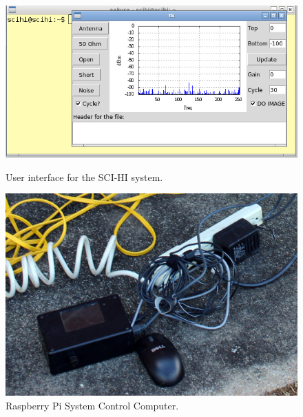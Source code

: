 \begin{figure}[htb]
\centering
\begin{minipage}[b]{0.48\textwidth}
\centering
\includegraphics[width=0.95\linewidth]{SCIHI_system/figures/SCIHI_UI_Screen.jpg}
\caption{User interface for the SCI-HI system. }
\label{Fig:GUI}
\end{minipage}%
\begin{minipage}[b]{0.02\textwidth}
\hspace{1cm}
\end{minipage}%
\begin{minipage}[b]{0.48\textwidth}
\centering
\includegraphics[width=0.95\linewidth]{SCIHI_system/figures/SCIHI_raspberry_pi.jpg}
\caption{Raspberry Pi System Control Computer.}
\label{Fig:raspberry_pi}

\end{minipage}
\end{figure}

